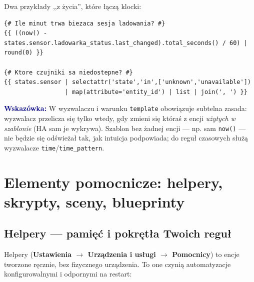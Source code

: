 \documentclass[11pt,a4paper]{article}
\newcommand{\wskazowka}[1]{\par\medskip\noindent\textcolor{navy}{\textbf{Wskazówka:}} #1\par\medskip}
\begin{document}
Dwa przykłady ,,z życia'', które łączą klocki:

\begin{lstlisting}
{# Ile minut trwa biezaca sesja ladowania? #}
{{ ((now() - states.sensor.ladowarka_status.last_changed).total_seconds() / 60) | round(0) }}

{# Ktore czujniki sa niedostepne? #}
{{ states.sensor | selectattr('state','in',['unknown','unavailable'])
                 | map(attribute='entity_id') | list | join(', ') }}
\end{lstlisting}

\wskazowka{W wyzwalaczu i warunku \texttt{template} obowiązuje subtelna zasada: wyzwalacz przelicza się tylko wtedy, gdy zmieni się któraś z encji \emph{użytych w szablonie} (HA sam je wykrywa). Szablon bez żadnej encji --- np. sam \texttt{now()} --- nie będzie się odświeżał tak, jak intuicja podpowiada; do reguł czasowych służą wyzwalacze \texttt{time}/\texttt{time\_pattern}.}

\section{Elementy pomocnicze: helpery, skrypty, sceny, blueprinty}
\label{sec:helpery}

\subsection{Helpery --- pamięć i pokrętła Twoich reguł}

Helpery (\textbf{Ustawienia $\to$ Urządzenia i usługi $\to$ Pomocnicy}) to encje tworzone ręcznie, bez fizycznego urządzenia. To one czynią automatyzacje konfigurowalnymi i odpornymi na restart:
\end{document}
